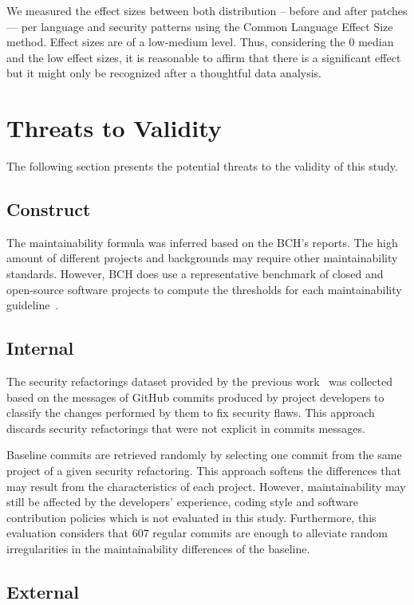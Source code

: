 \documentclass[10pt,conference]{IEEEtran}
\begin{document}
We measured the effect sizes between both distribution -- before and after
patches --- per language and security patterns using the Common Language Effect
Size~\cite{cliff:1993} method. Effect sizes are of a low-medium level.
Thus, considering the $0$ median and the low effect sizes, it is reasonable
to affirm that there is a significant effect but it might only be
recognized after a thoughtful data analysis.


\section{Threats to Validity}\label{sec:threats}
%
The following section presents the potential threats to the validity of this
study.
%
\subsection{Construct}
%
The maintainability formula was inferred based on the BCH's reports. The high
amount of different projects and backgrounds may require other
maintainability standards. However, BCH does use a representative benchmark of
closed and open-source software projects to compute the
thresholds for each maintainability guideline~\cite{Visser:2016:OREILLY, Baggen2012}.

\subsection{Internal}

The security refactorings dataset provided by the previous
work~\cite{Reis:2017:IJSSE} was collected based on the messages of GitHub
commits produced by project developers to classify the changes performed by them
to fix security flaws. This approach discards security refactorings that were
not explicit in commits messages.

Baseline commits are retrieved randomly by selecting one commit from the same
project of a given security refactoring. This approach softens the differences
that may result from the characteristics of each project. However,
maintainability may still be affected by the developers' experience, coding
style and software contribution policies which is not evaluated in this study.
Furthermore, this evaluation considers that $607$ regular commits are enough to
alleviate random irregularities in the maintainability differences of the
baseline.

\subsection{External}
\end{document}
